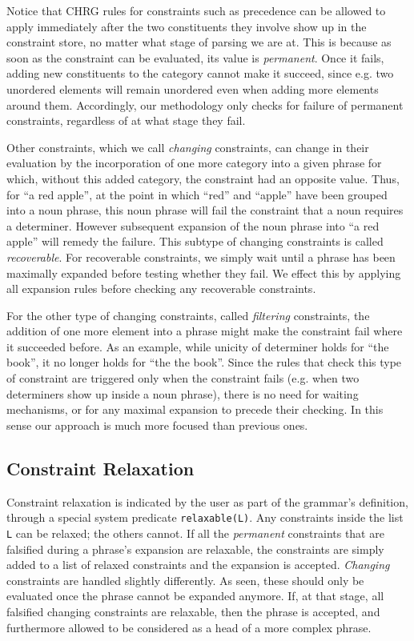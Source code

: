 \documentclass{llncs}
\begin{document}
Notice that CHRG rules  for constraints such as precedence can be allowed to apply  immediately after the two constituents they involve show up in the constraint store, no matter what stage of parsing we are at.  This is because as soon as the constraint can be evaluated, its value is \emph{permanent}. Once it fails, adding new constituents to the category cannot make it succeed, since e.g. two unordered elements will remain unordered even when adding more elements around them.  Accordingly, our methodology only checks for failure of permanent constraints, regardless of at what stage they fail.

Other constraints, which we call \emph{changing} constraints, can change in their  evaluation by the incorporation of one
more category into a given phrase for which, without this added category, the
constraint had an opposite value. Thus, for ``a red apple'',  at the point in which ``red'' and ``apple'' have been grouped into a noun phrase, this noun phrase will fail the constraint that a noun requires a determiner. However subsequent expansion of the noun phrase into ``a red apple'' will remedy the failure. This subtype of changing constraints is called \emph{recoverable}. For recoverable constraints, we simply wait until a phrase has been maximally expanded before testing whether they fail. We effect this by applying all expansion rules  before checking any recoverable constraints.

For the other type of changing constraints, called \emph{filtering} constraints, the addition of one more element into a phrase might make the constraint fail where it succeeded before. As an example, while unicity of determiner holds for ``the book'', it no longer holds for ``the the book''. Since the rules that check this type of constraint are triggered only when the constraint fails (e.g. when two determiners show up inside a noun phrase), there is no need for waiting mechanisms, or for any maximal expansion to precede their checking. In this sense our approach is much more focused than previous ones. 


\subsection{Constraint Relaxation}

Constraint relaxation is indicated by the user as part of the grammar's definition, through a special system predicate \texttt{relaxable(L)}. Any constraints inside the list \texttt{L} can be relaxed; the others cannot. If all the \emph{permanent} constraints that are falsified during a phrase's expansion are relaxable, the constraints are simply added to a list of relaxed constraints and the expansion is accepted.  \emph{Changing} constraints are handled slightly differently. As seen, these should only be evaluated once the phrase cannot be expanded anymore. If, at that stage, all falsified changing constraints are relaxable, then the phrase is accepted, and furthermore allowed to be considered as a head of a more complex phrase.
\end{document}
